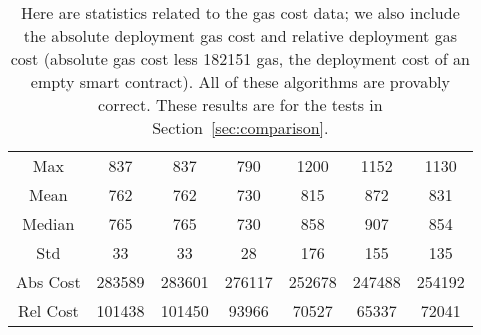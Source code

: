 \begin{table}[p]
\centering
\begin{tabular}{|c|
    |S[table-format=6.0]|S[table-format=6.0]
    |S[table-format=6.0]|S[table-format=6.0]
    |S[table-format=6.0]|S[table-format=6.0]|}
\hline
    & \UnrolledOne{} & \UnrolledTwo{} &
     \UnrolledThree{} &
    \WhileOne{} & \WhileTwo{} & \WhileThree{} \\
\hline
Max      &    837 &    837 &     790 &                         1200 &                         1152 &                         1130 \\
Mean     &    762 &    762 &     730 &                          815 &                          872 &                          831 \\
Median   &    765 &    765 &     730 &                          858 &                          907 &                          854 \\
Std      &     33 &     33 &      28 &                          176 &                          155 &                          135 \\
\hline
Abs Cost & 283589 & 283601 &  276117 &  252678 &  247488 &  254192 \\
Rel Cost & 101438 & 101450 &   93966 &   70527 &   65337 &   72041 \\
\hline
\end{tabular}
\caption[Gas Costs Statistics 2]{Here are statistics
    related to the gas cost data;
    we also include the absolute deployment gas cost and
    relative deployment gas cost
    (absolute gas cost less 182151 gas,
    the deployment cost of an empty smart contract).
    All of these algorithms are provably correct.
    These results are for the tests in Section~\ref{sec:comparison}.
    }
\label{table:gas_costs_2}
\end{table}
